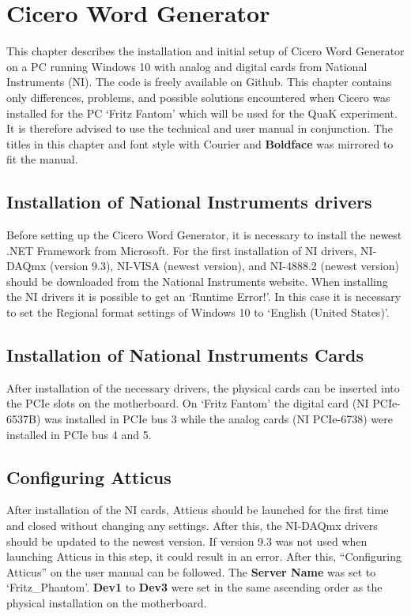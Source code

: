 
\chapter{Cicero Word Generator}\label{chap:Cicero}
This chapter describes the installation and initial setup of Cicero Word Generator\autocite{keshet2013distributed} on a PC running Windows 10 with analog and digital cards from National Instruments (NI). The code is freely available on Github\autocite{akeshet:Github}. This chapter contains only differences, problems, and possible solutions encountered when Cicero was installed for the PC `Fritz Fantom' which will be used for the QuaK experiment. It is therefore advised to use the technical and user manual\autocite{akeshet:manual} in conjunction. The titles in this chapter and font style with {\selectfont Courier} and \textbf{Boldface} was mirrored to fit the manual.

\section{Installation of National Instruments drivers}\label{sec:NI Drivers}
Before setting up the Cicero Word Generator, it is necessary to install the newest .NET Framework\autocite{microsoft:download.net} from Microsoft. For the first installation of NI drivers, NI-DAQmx (version 9.3), NI-VISA (newest version), and NI-4888.2 (newest version) should be downloaded from the National Instruments website\autocite{ni:drivers}. When installing the NI drivers it is possible to get an `Runtime Error!'. In this case it is necessary to set the Regional format settings of Windows 10 to `English (United States)'\autocite{ni:runtimeerror}.

\section{Installation of National Instruments Cards}\label{sec:NI Cards}
After installation of the necessary drivers, the physical cards can be inserted into the PCIe slots on the motherboard. On `Fritz Fantom' the digital card (NI PCIe-6537B) was installed in PCIe bus 3 while the analog cards (NI PCIe-6738) were installed in PCIe bus 4 and 5.

\section{Configuring Atticus}\label{sec:Configuring Atticus}
After installation of the NI cards, Atticus should be launched for the first time and closed without changing any settings. After this, the NI-DAQmx drivers should be updated to the newest version. If version 9.3 was not used when launching Atticus in this step, it could result in an error. After this, ``Configuring Atticus'' on the user manual can be followed. The \textbf{Server Name} was set to `Fritz\_Phantom'. \textbf{Dev1} to \textbf{Dev3} were set in the same ascending order as the physical installation on the motherboard.

